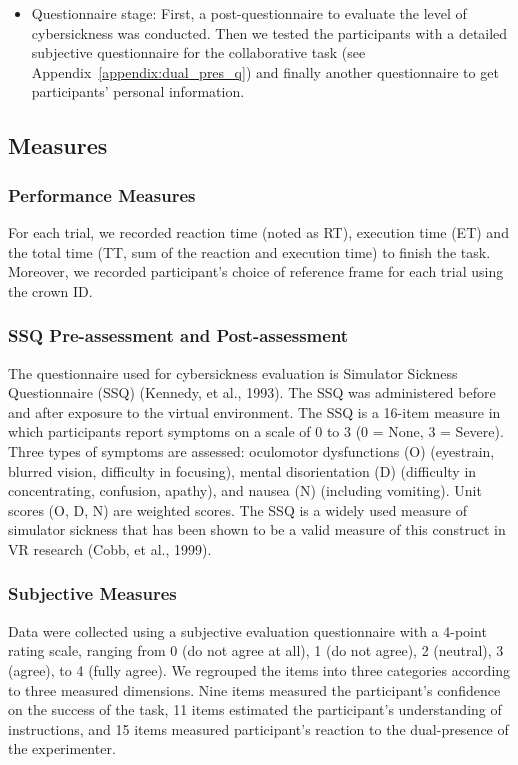 \begin{itemize}
\item Questionnaire stage: First, a post-questionnaire to evaluate the level of cybersickness was conducted. Then we tested the participants with a detailed subjective questionnaire for the collaborative task (see Appendix~\ref{appendix:dual_pres_q}) and finally another questionnaire to get participants' personal information.
\end{itemize}


\subsection{Measures}
\subsubsection{Performance Measures}
For each trial, we recorded reaction time (noted as RT), execution time (ET) and the total time (TT, sum of the reaction and execution time) to finish the task. Moreover, we recorded participant's choice of reference frame for each trial using the crown ID.

\subsubsection{SSQ Pre-assessment and Post-assessment}
The questionnaire used for cybersickness evaluation is Simulator Sickness Questionnaire (SSQ) (Kennedy, et al., 1993). The SSQ was administered before and after exposure to the virtual environment. The SSQ is a 16-item measure in which participants report symptoms on a scale of 0 to 3 (0 = None, 3 = Severe). Three types of symptoms are assessed: oculomotor dysfunctions (O) (eyestrain, blurred vision, difficulty in focusing), mental disorientation (D) (difficulty in concentrating, confusion, apathy), and nausea (N) (including vomiting). Unit scores (O, D, N) are weighted scores. The SSQ is a widely used measure of simulator sickness that has been shown to be a valid measure of this construct in VR research (Cobb, et al., 1999).

\subsubsection{Subjective Measures}
Data were collected using a subjective evaluation questionnaire with a 4-point rating scale, ranging from 0 (do not agree at all), 1 (do not agree), 2 (neutral), 3 (agree), to 4 (fully agree). We regrouped the items into three categories according to three measured dimensions. Nine items measured the participant's confidence on the success of the task, 11 items estimated the participant's understanding of instructions, and 15 items measured participant's reaction to the dual-presence of the experimenter.

